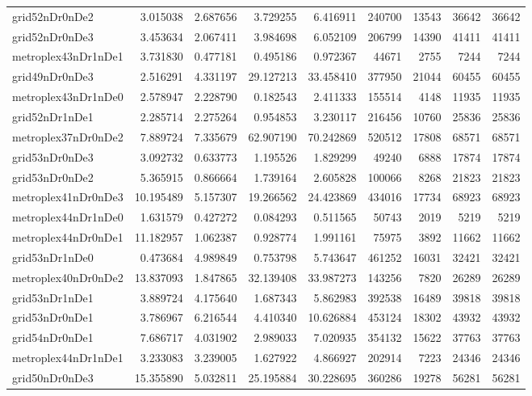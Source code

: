 \begin{longtable}{|l|r|r|r|r|r|r|r|r|}
grid52nDr0nDe2 & 3.015038 & 2.687656 & 3.729255 & 6.416911 & 240700 & 13543 & 36642 & 36642 \\
grid52nDr0nDe3 & 3.453634 & 2.067411 & 3.984698 & 6.052109 & 206799 & 14390 & 41411 & 41411 \\
metroplex43nDr1nDe1 & 3.731830 & 0.477181 & 0.495186 & 0.972367 & 44671 & 2755 & 7244 & 7244 \\
grid49nDr0nDe3 & 2.516291 & 4.331197 & 29.127213 & 33.458410 & 377950 & 21044 & 60455 & 60455 \\
metroplex43nDr1nDe0 & 2.578947 & 2.228790 & 0.182543 & 2.411333 & 155514 & 4148 & 11935 & 11935 \\
grid52nDr1nDe1 & 2.285714 & 2.275264 & 0.954853 & 3.230117 & 216456 & 10760 & 25836 & 25836 \\
metroplex37nDr0nDe2 & 7.889724 & 7.335679 & 62.907190 & 70.242869 & 520512 & 17808 & 68571 & 68571 \\
grid53nDr0nDe3 & 3.092732 & 0.633773 & 1.195526 & 1.829299 & 49240 & 6888 & 17874 & 17874 \\
grid53nDr0nDe2 & 5.365915 & 0.866664 & 1.739164 & 2.605828 & 100066 & 8268 & 21823 & 21823 \\
metroplex41nDr0nDe3 & 10.195489 & 5.157307 & 19.266562 & 24.423869 & 434016 & 17734 & 68923 & 68923 \\
metroplex44nDr1nDe0 & 1.631579 & 0.427272 & 0.084293 & 0.511565 & 50743 & 2019 & 5219 & 5219 \\
metroplex44nDr0nDe1 & 11.182957 & 1.062387 & 0.928774 & 1.991161 & 75975 & 3892 & 11662 & 11662 \\
grid53nDr1nDe0 & 0.473684 & 4.989849 & 0.753798 & 5.743647 & 461252 & 16031 & 32421 & 32421 \\
metroplex40nDr0nDe2 & 13.837093 & 1.847865 & 32.139408 & 33.987273 & 143256 & 7820 & 26289 & 26289 \\
grid53nDr1nDe1 & 3.889724 & 4.175640 & 1.687343 & 5.862983 & 392538 & 16489 & 39818 & 39818 \\
grid53nDr0nDe1 & 3.786967 & 6.216544 & 4.410340 & 10.626884 & 453124 & 18302 & 43932 & 43932 \\
grid54nDr0nDe1 & 7.686717 & 4.031902 & 2.989033 & 7.020935 & 354132 & 15622 & 37763 & 37763 \\
metroplex44nDr1nDe1 & 3.233083 & 3.239005 & 1.627922 & 4.866927 & 202914 & 7223 & 24346 & 24346 \\
grid50nDr0nDe3 & 15.355890 & 5.032811 & 25.195884 & 30.228695 & 360286 & 19278 & 56281 & 56281 \\

\end{longtable}
